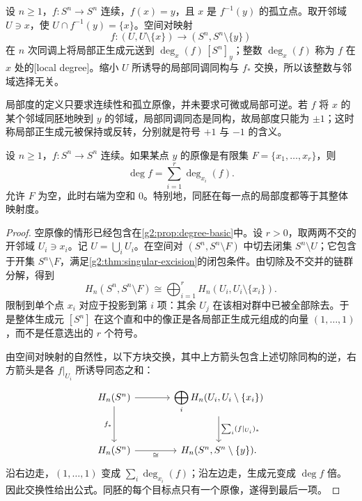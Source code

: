 \begin{definition}[局部度]\label{g2:def:local-degree}
	设 \(n\ge1\)，\(f:S^n\rightarrow S^n\) 连续，\(f(x)=y\)，且 \(x\) 是 \(f^{-1}(y)\) 的孤立点。取开邻域 \(U\ni x\)，使 \(U\cap f^{-1}(y)=\{x\}\)。空间对映射
	\[
		f:(U,U\setminus\{x\})\longrightarrow(S^n,S^n\setminus\{y\})
	\]
	在 \(n\) 次同调上将局部正生成元送到 \(\deg_x(f)\,[S^n]_y\)；整数 \(\deg_x(f)\) 称为 \(f\) 在 \(x\) 处的[local degree]。缩小 \(U\) 所诱导的局部同调同构与 \(f_*\) 交换，所以该整数与邻域选择无关。
\end{definition}

局部度的定义只要求连续性和孤立原像，并未要求可微或局部可逆。若 \(f\) 将 \(x\) 的某个邻域同胚地映到 \(y\) 的邻域，局部同调同态是同构，故局部度只能为 \(\pm1\)；这时称局部正生成元被保持或反转，分别就是符号 \(+1\) 与 \(-1\) 的含义。

\begin{theorem}\label{g2:thm:local-degree-sum}
	设 \(n\ge1\)，\(f:S^n\rightarrow S^n\) 连续。如果某点 \(y\) 的原像是有限集 \(F=\{x_1,\ldots,x_r\}\)，则
	\begin{equation}\label{g2:eq:local-degree-sum}
		\deg f=\sum_{i=1}^r\deg_{x_i}(f).
	\end{equation}
	允许 \(F\) 为空，此时右端为空和 \(0\)。特别地，同胚在每一点的局部度都等于其整体映射度。
\end{theorem}
\begin{proof}
	空原像的情形已经包含在\cref{g2:prop:degree-basic}中。设 \(r>0\)，取两两不交的开邻域 \(U_i\ni x_i\)。记 \(U=\bigcup_iU_i\)。在空间对 \((S^n,S^n\setminus F)\) 中切去闭集 \(S^n\setminus U\)；它包含于开集 \(S^n\setminus F\)，满足\cref{g2:thm:singular-excision}的闭包条件。由切除及不交并的链群分解，得到
	\[
		H_n(S^n,S^n\setminus F)
		\cong\bigoplus_{i=1}^r H_n(U_i,U_i\setminus\{x_i\}).
	\]
	限制到单个点 \(x_i\) 对应于投影到第 \(i\) 项：其余 \(U_j\) 在该相对群中已被全部除去。于是整体生成元 \([S^n]\) 在这个直和中的像正是各局部正生成元组成的向量 \((1,\ldots,1)\)，而不是任意选出的 \(r\) 个符号。

	由空间对映射的自然性，以下方块交换，其中上方箭头包含上述切除同构的逆，右方箭头是各 \(f|_{U_i}\) 所诱导同态之和：
	\[
		\begin{tikzcd}[column sep=large,row sep=large]
			H_n(S^n) \arrow[r] \arrow[d,"f_*"'] & \displaystyle\bigoplus_i H_n(U_i,U_i\setminus\{x_i\}) \arrow[d,"\sum_i(f|_{U_i})_*"] \\
			H_n(S^n) \arrow[r,"\cong"'] & H_n(S^n,S^n\setminus\{y\}).
		\end{tikzcd}
	\]
	沿右边走，\((1,\ldots,1)\) 变成 \(\sum_i\deg_{x_i}(f)\)；沿左边走，生成元变成 \(\deg f\) 倍。因此交换性给出公式。同胚的每个目标点只有一个原像，遂得到最后一项。
\end{proof}

